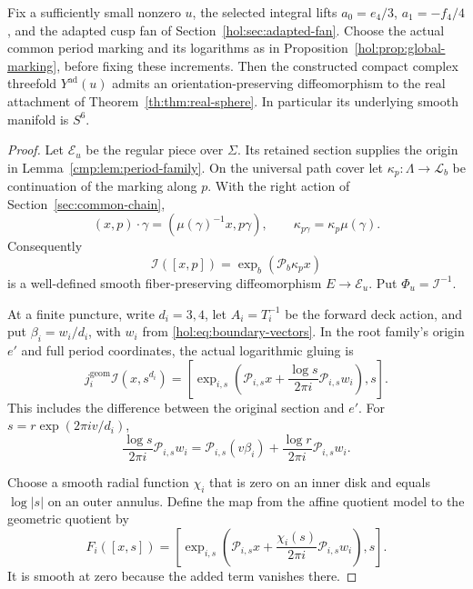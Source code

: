 \documentclass[11pt]{article}
\numberwithin{equation}{section}
\begin{document}
\begin{theorem}\label{cmp:thm:comparison}
Fix a sufficiently small nonzero $u$, the selected integral lifts
$a_0=e_4/3$, $a_1=-f_4/4$, and the adapted cusp fan of
Section~\ref{hol:sec:adapted-fan}. Choose the actual common period
marking and its logarithms as in
Proposition~\ref{hol:prop:global-marking}, before fixing these
increments. Then the
constructed compact complex threefold $Y^{\mathrm{ad}}(u)$ admits
an orientation-preserving diffeomorphism to the real attachment of
Theorem~\ref{th:thm:real-sphere}. In particular its underlying smooth
manifold is $S^6$.
\end{theorem}

\begin{proof}
Let $\mathcal E_u$ be the regular piece over $\Sigma$. Its retained
section supplies the origin in Lemma~\ref{cmp:lem:period-family}.
On the universal path cover let
$\kappa_p:\Lambda\to\mathscr L_b$ be continuation of the marking
along $p$. With the right action of Section~\ref{sec:common-chain},
\[
 (x,p)\cdot\gamma=(\mu(\gamma)^{-1}x,p\gamma),\qquad
 \kappa_{p\gamma}=\kappa_p\mu(\gamma).
\]
Consequently
\begin{equation}\label{cmp:eq:regular}
 \mathcal I([x,p])=\exp_b(\mathcal P_b\kappa_p x)
\end{equation}
is a well-defined smooth fiber-preserving diffeomorphism
$E\to\mathcal E_u$. Put $\Phi_u=\mathcal I^{-1}$.

At a finite puncture, write $d_i=3,4$, let $A_i=T_i^{-1}$ be the
forward deck action, and put
$\beta_i=w_i/d_i$, with $w_i$ from
\eqref{hol:eq:boundary-vectors}. In the root family's origin $e'$
and full period coordinates, the actual logarithmic gluing is
\begin{equation}\label{cmp:eq:geometric-collar}
 j_i^{\mathrm{geom}}\mathcal I(x,s^{d_i})=
 \left[\exp_{i,s}\left(\mathcal P_{i,s}x+
       \frac{\log s}{2\pi i}\mathcal P_{i,s}w_i\right),s\right].
\end{equation}
This includes the difference between the original section and $e'$.
For $s=r\exp(2\pi iv/d_i)$,
\begin{equation}\label{cmp:eq:radial-log}
 \frac{\log s}{2\pi i}\mathcal P_{i,s}w_i
 =\mathcal P_{i,s}(v\beta_i)
   +\frac{\log r}{2\pi i}\mathcal P_{i,s}w_i.
\end{equation}

Choose a smooth radial function $\chi_i$ that is zero on an inner
disk and equals $\log|s|$ on an outer annulus. Define the map from
the affine quotient model to the geometric quotient by
\begin{equation}\label{cmp:eq:finite}
 F_i([x,s])=
 \left[\exp_{i,s}\left(\mathcal P_{i,s}x+
       \frac{\chi_i(s)}{2\pi i}\mathcal P_{i,s}w_i\right),s\right].
\end{equation}
It is smooth at zero because the added term vanishes there.


\end{proof}
\end{document}
